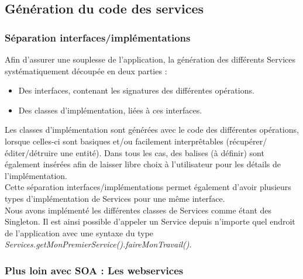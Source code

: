 \subsection{Génération du code des services}

\subsubsection{Séparation interfaces/implémentations}

Afin d'assurer une souplesse de l'application, la génération des différents Services systématiquement découpée en deux parties :
\begin{itemize}
\item Des interfaces, contenant les signatures des différentes opérations.
\item Des classes d'implémentation, liées à ces interfaces.
\end{itemize}	

Les classes d'implémentation sont générées avec le code des différentes opérations, lorsque celles-ci sont basiques et/ou facilement interprêtables (récupérer/éditer/détruire une entité). Dans tous les cas, des balises  (à définir) sont également insérées afin de laisser libre choix à l'utilisateur pour les détails de l'implémentation.\\
Cette séparation interfaces/implémentations permet également d'avoir plusieurs types d'implémentation de Services pour une même interface.\\
Nous avons implémenté les différentes classes de Services comme étant des Singleton. Il est ainsi possible d'appeler un Service depuis n'importe quel endroit de l'application avec une syntaxe du type \textit{Services.getMonPremierService().faireMonTravail()}.

\subsubsection{Plus loin avec SOA : Les webservices}

